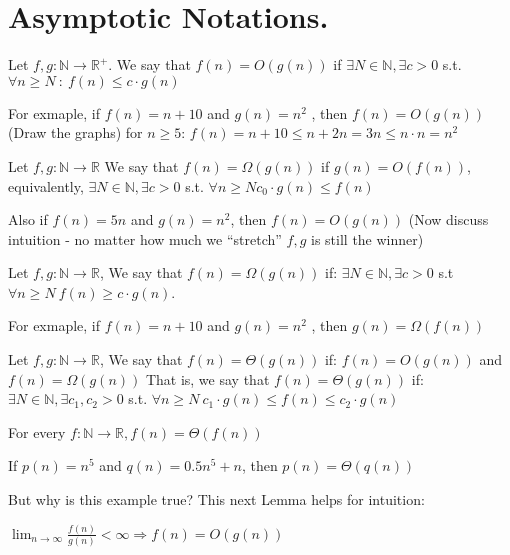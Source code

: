 \section{Asymptotic Notations.}
\begin{definition}
  Let \( f, g : \mathbb{N} \rightarrow \mathbb{R}^{+} \). We say that \( f(n) = O(g(n))\)  if \( \exists N \in \mathbb{N}, \exists c > 0 \) s.t. \( \forall n \ge N \ : \ f(n) \le c \cdot g(n)\)
\end{definition}
\begin{example}
  For exmaple, if \(f(n) = n + 10 \) and \( g(n) = n^2\)
, then \(f(n) = O(g(n)) \) (Draw the graphs) for \(n \ge 5 \):
\(f(n) = n + 10 \le n + 2n = 3n \le n \cdot n = n^2\)
\end{example}
\begin{definition} 
Let \( f, g : \mathbb{N} \rightarrow \mathbb{R} \)
We say that \(f(n) = \Omega(g(n))\) if \(g(n) = O(f(n))\), equivalently,
\( \exists N \in \mathbb{N}, \exists c > 0 \) s.t. \( \forall n \ge N c_0· g(n) \le f(n) \)
\end{definition}
\begin{example}
  Also if \( f(n) = 5n\) and \(g(n) = n^2\), then \(f(n) = O(g(n))\) (Now discuss intuition - no matter how much we “stretch” \(f, g\) is still the winner)
\end{example}
\begin{definition} 
Let \( f, g : \mathbb{N} \rightarrow \mathbb{R} \), We say that \(f(n) = \Omega(g(n))\) if:
\( \exists N \in \mathbb{N}, \exists c > 0 \) s.t \( \forall n \ge N \ f(n) \ge c \cdot g(n) \).
\end{definition}
\begin{example}
For exmaple, if \(f(n) = n + 10\) and \(g(n) = n^2\)
, then \(g(n) = \Omega(f(n))\)
\end{example}
\begin{definition}
Let \( f, g : \mathbb{N} \rightarrow \mathbb{R} \), We say that \(f(n) = \Theta(g(n))\) if:
\(f(n) = O(g(n))\) and \(f(n) = \Omega(g(n))\)
That is, we say that \(f(n) = \Theta(g(n))\) if:
\( \exists N \in \mathbb{N}, \exists c_1, c_2 > 0\) s.t. \(\forall n \ge N \ c_1\cdot g(n) \le f(n) \le c_2 \cdot g(n)\)
\end{definition}
\begin{example} For every \(f : \mathbb{N} \rightarrow \mathbb{R}, f(n) = \Theta(f(n))\) \end{example}
\begin{example} If \(p(n) = n^5\) and \(q(n) = 0.5n^5 + n\), then \(p(n) = \Theta(q(n))\)\end{example}
But why is this example true? This next Lemma helps for intuition:
\begin{lemma}
  \( \lim_{n \rightarrow \infty} \frac{f(n)}{g(n)} < \infty \Rightarrow f(n) = O(g(n)) \)
\end{lemma}

